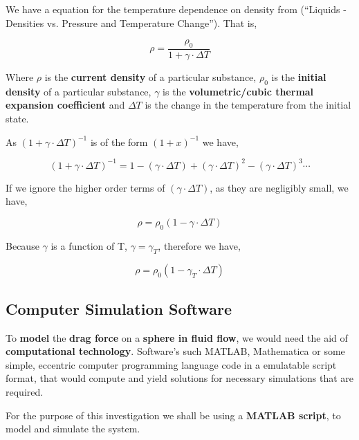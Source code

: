 	{We have a equation for the temperature dependence on density from (“Liquids - Densities vs. Pressure and Temperature Change”). That is,}            
            
		$$\rho = \frac{\rho_{0}}{1 + \gamma\cdot\Delta T}$$            

	{Where $\rho$ is the \textbf{current density} of a particular substance, $\rho_{0}$ is the \textbf{initial density} of a particular substance, $\gamma$ is the \textbf{volumetric/cubic thermal expansion coefficient} and $\Delta T$ is the change in the temperature from the initial state.}            

	{As $\left(1 + \gamma\cdot\Delta T\right)^{-1}$ is of the form $\left(1 + x\right)^{-1}$ we have,}
	
		$$\left(1 + \gamma\cdot\Delta T\right)^{-1} = 1 - \left(\gamma\cdot\Delta T\right) + \left(\gamma\cdot\Delta T\right)^2 - \left(\gamma\cdot\Delta T\right)^3 \cdots$$

	{If we ignore the higher order terms of $\left(\gamma\cdot\Delta T\right)$, as they are negligibly small, we have,}
            
		$$\rho = \rho_{0}\left(1 - \gamma\cdot\Delta T\right)$$            

	{Because $\gamma$ is a function of T, $\gamma = \gamma_{T}$, therefore we have,}

		$$\rho = \rho_{0}\left(1 - \gamma_{T}\cdot\Delta T\right)$$
                      
\subsection{{Computer Simulation Software}}
        
    {To \textbf{model} the \textbf{drag force} on a \textbf{sphere in fluid flow}, we would need the aid of \textbf{computational technology}. Software's such MATLAB, Mathematica or some simple, eccentric computer programming language code in a emulatable script format, that would compute and yield solutions for necessary simulations that are required.}

    {For the purpose of this investigation we shall be using a \textbf{MATLAB script}, to model and simulate the system.}
        
        


